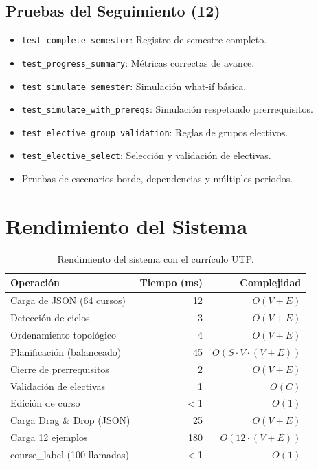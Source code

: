 \documentclass[12pt]{report}
\begin{document}
\subsection{Pruebas del Seguimiento (12)}
\begin{itemize}
    \item \texttt{test\_complete\_semester}: Registro de semestre completo.
    \item \texttt{test\_progress\_summary}: Métricas correctas de avance.
    \item \texttt{test\_simulate\_semester}: Simulación what-if básica.
    \item \texttt{test\_simulate\_with\_prereqs}: Simulación respetando prerrequisitos.
    \item \texttt{test\_elective\_group\_validation}: Reglas de grupos electivos.
    \item \texttt{test\_elective\_select}: Selección y validación de electivas.
    \item Pruebas de escenarios borde, dependencias y múltiples periodos.
\end{itemize}

\section{Rendimiento del Sistema}

\begin{table}[H]
    \centering
    \begin{tabular}{lrr}
        \toprule
        \textbf{Operación} & \textbf{Tiempo (ms)} & \textbf{Complejidad} \\
        \midrule
        Carga de JSON (64 cursos) & 12 & $O(V+E)$ \\
        Detección de ciclos & 3 & $O(V+E)$ \\
        Ordenamiento topológico & 4 & $O(V+E)$ \\
        Planificación (balanceado) & 45 & $O(S\cdot V\cdot(V+E))$ \\
        Cierre de prerrequisitos & 2 & $O(V+E)$ \\
        Validación de electivas & 1 & $O(C)$ \\
        Edición de curso & $<$1 & $O(1)$ \\
        Carga Drag \& Drop (JSON) & 25 & $O(V+E)$ \\
        Carga 12 ejemplos & 180 & $O(12\cdot(V+E))$ \\
        course\_label (100 llamadas) & $<$1 & $O(1)$ \\
        \bottomrule
    \end{tabular}
    \caption{Rendimiento del sistema con el currículo UTP.}
    \label{tab:performance}
\end{table}
\end{document}
